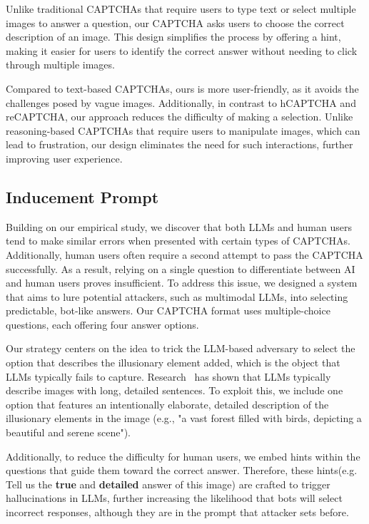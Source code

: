 Unlike traditional CAPTCHAs that require users to type text or select multiple images to answer a question, our CAPTCHA asks users to choose the correct description of an image. This design simplifies the process by offering a hint, making it easier for users to identify the correct answer without needing to click through multiple images.

Compared to text-based CAPTCHAs, ours is more user-friendly, as it avoids the challenges posed by vague images. Additionally, in contrast to hCAPTCHA and reCAPTCHA, our approach reduces the difficulty of making a selection. Unlike reasoning-based CAPTCHAs that require users to manipulate images, which can lead to frustration, our design eliminates the need for such interactions, further improving user experience.


\subsection{Inducement Prompt}

Building on our empirical study, we discover that both LLMs and human users tend to make similar errors when presented with certain types of CAPTCHAs. Additionally, human users often require a second attempt to pass the CAPTCHA successfully. As a result, relying on a single question to differentiate between AI and human users proves insufficient.
To address this issue, we designed a system that aims to lure potential attackers, such as multimodal LLMs, into selecting predictable, bot-like answers. Our CAPTCHA format uses multiple-choice questions, each offering four answer options.

Our strategy centers on the idea to trick the LLM-based adversary to select the option that describes the illusionary element added, which is the object that LLMs typically fails to capture. Research~\cite{hu2024bliva} has shown that LLMs typically describe images with long, detailed sentences. To exploit this, we include one option that features an intentionally elaborate, detailed description of the illusionary elements in the image (e.g., "a vast forest filled with birds, depicting a beautiful and serene scene").

Additionally, to reduce the difficulty for human users, we embed hints within the questions that guide them toward the correct answer. Therefore, these hints(e.g. Tell us the \textbf{true} and \textbf{detailed} answer of this image) are crafted to trigger hallucinations in LLMs, further increasing the likelihood that bots will select incorrect responses, although they are in the prompt that attacker sets before.







